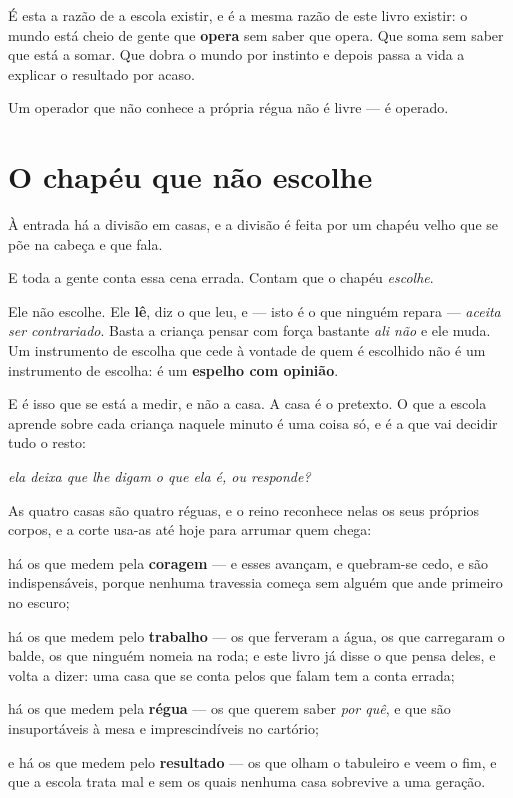\documentclass[livro.tex]{subfiles}
\begin{document}
\medskip

É esta a razão de a escola existir, e é a mesma razão de este livro existir: o mundo está
cheio de gente que \textbf{opera} sem saber que opera. Que soma sem saber que está a
somar. Que dobra o mundo por instinto e depois passa a vida a explicar o resultado por
acaso.

Um operador que não conhece a própria régua não é livre --- é operado.

\section{O chapéu que não escolhe}

À entrada há a divisão em casas, e a divisão é feita por um chapéu velho que se põe na
cabeça e que fala.

E toda a gente conta essa cena errada. Contam que o chapéu \emph{escolhe}.

Ele não escolhe. Ele \textbf{lê}, diz o que leu, e --- isto é o que ninguém repara ---
\emph{aceita ser contrariado}. Basta a criança pensar com força bastante \emph{ali não} e
ele muda. Um instrumento de escolha que cede à vontade de quem é escolhido não é um
instrumento de escolha: é um \textbf{espelho com opinião}.

E é isso que se está a medir, e não a casa. A casa é o pretexto. O que a escola aprende
sobre cada criança naquele minuto é uma coisa só, e é a que vai decidir tudo o resto:

\emph{ela deixa que lhe digam o que ela é, ou responde?}

\medskip

As quatro casas são quatro réguas, e o reino reconhece nelas os seus próprios corpos, e a
corte usa-as até hoje para arrumar quem chega:

há os que medem pela \textbf{coragem} --- e esses avançam, e quebram-se cedo, e são
indispensáveis, porque nenhuma travessia começa sem alguém que ande primeiro no escuro;

há os que medem pelo \textbf{trabalho} --- os que ferveram a água, os que carregaram o
balde, os que ninguém nomeia na roda; e este livro já disse o que pensa deles, e volta a
dizer: uma casa que se conta pelos que falam tem a conta errada;

há os que medem pela \textbf{régua} --- os que querem saber \emph{por quê}, e que são
insuportáveis à mesa e imprescindíveis no cartório;

e há os que medem pelo \textbf{resultado} --- os que olham o tabuleiro e veem o fim, e que
a escola trata mal e sem os quais nenhuma casa sobrevive a uma geração.
\end{document}
